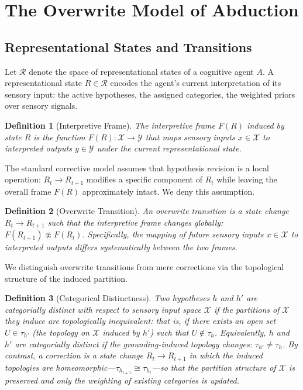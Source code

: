 \documentclass[12pt]{article}
\newtheorem{definition}{Definition}
\begin{document}
\section{The Overwrite Model of Abduction}

\subsection{Representational States and Transitions}

Let $\mathcal{R}$ denote the space of representational states of a
cognitive agent $A$.
A representational state $R \in \mathcal{R}$ encodes the agent's current
interpretation of its sensory input: the active hypotheses, the assigned
categories, the weighted priors over sensory signals.

\begin{definition}[Interpretive Frame]
The interpretive frame $F(R)$ induced by state $R$ is the function
$F(R) : \mathcal{X} \to \mathcal{Y}$
that maps sensory inputs $x \in \mathcal{X}$ to interpreted outputs
$y \in \mathcal{Y}$ under the current representational state.
\end{definition}

The standard corrective model assumes that hypothesis revision is a
local operation: $R_t \to R_{t+1}$ modifies a specific component of
$R_t$ while leaving the overall frame $F(R)$ approximately intact.
We deny this assumption.

\begin{definition}[Overwrite Transition]
An overwrite transition is a state change $R_t \to R_{t+1}$ such that
the interpretive frame changes globally:
$F(R_{t+1}) \not\approx F(R_t)$.
Specifically, the mapping of future sensory inputs $x \in \mathcal{X}$
to interpreted outputs differs systematically between the two frames.
\end{definition}

We distinguish overwrite transitions from mere corrections via the
topological structure of the induced partition.

\begin{definition}[Categorical Distinctness]
\label{def:categorical-distinctness}
Two hypotheses $h$ and $h'$ are \emph{categorially distinct} with
respect to sensory input space $\mathcal{X}$ if the partitions of
$\mathcal{X}$ they induce are topologically inequivalent: that is,
if there exists an open set $U \in \tau_{h'}$ (the topology on $\mathcal{X}$
induced by $h'$) such that $U \notin \tau_h$.
Equivalently, $h$ and $h'$ are categorially distinct if the
grounding-induced topology changes: $\tau_{h'} \neq \tau_h$.
By contrast, a \emph{correction} is a state change $R_t \to R_{t+1}$
in which the induced topologies are homeomorphic---$\tau_{h_{t+1}} \cong \tau_{h_t}$---so that the partition structure of $\mathcal{X}$ is preserved
and only the weighting of existing categories is updated.
\end{definition}
\end{document}
